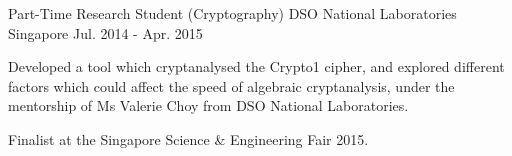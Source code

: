 \begin{cventries}
  \cventry
    {Part-Time Research Student (Cryptography)} %
    {DSO National Laboratories} %
    {Singapore} %
    {Jul. 2014 - Apr. 2015} %
    {
      \begin{cvitems} %
        \item {Developed a tool which cryptanalysed the Crypto1 cipher, and explored different factors which could affect the speed of algebraic cryptanalysis, under the mentorship of Ms Valerie Choy from DSO National Laboratories.}
        \item {Finalist at the Singapore Science \& Engineering Fair 2015.}
      \end{cvitems}
    }
\end{cventries}
